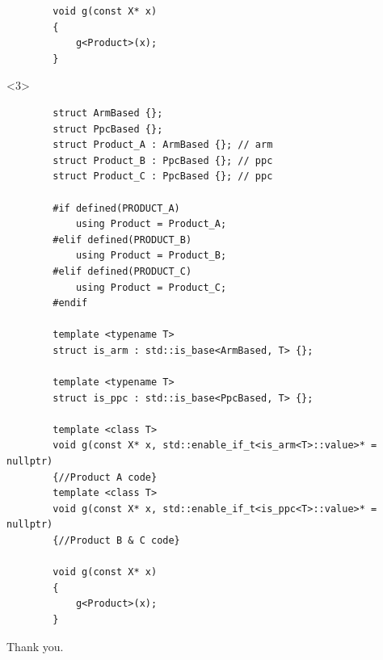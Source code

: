 \documentclass{beamer}
\begin{document}
\begin{frame}[fragile,t]
\begin{onlyenv}
\begin{lstlisting}
        void g(const X* x)
        {
            g<Product>(x); 
        }
    \end{lstlisting}
    \end{onlyenv}

    \begin{onlyenv}<3>
    \begin{lstlisting}
        struct ArmBased {};
        struct PpcBased {};
        struct Product_A : ArmBased {}; // arm
        struct Product_B : PpcBased {}; // ppc
        struct Product_C : PpcBased {}; // ppc

        #if defined(PRODUCT_A)
            using Product = Product_A;
        #elif defined(PRODUCT_B)
            using Product = Product_B;
        #elif defined(PRODUCT_C)
            using Product = Product_C;
        #endif

        template <typename T>
        struct is_arm : std::is_base<ArmBased, T> {};

        template <typename T>
        struct is_ppc : std::is_base<PpcBased, T> {};

        template <class T>
        void g(const X* x, std::enable_if_t<is_arm<T>::value>* = nullptr)
        {//Product A code}
        template <class T>
        void g(const X* x, std::enable_if_t<is_ppc<T>::value>* = nullptr)
        {//Product B & C code}
        
        void g(const X* x)
        {
            g<Product>(x); 
        }
    \end{lstlisting}
    \end{onlyenv}
\end{frame}


\begin{frame}
    \begin{center}
        Thank you.
    \end{center}
\end{frame}
\end{document}
